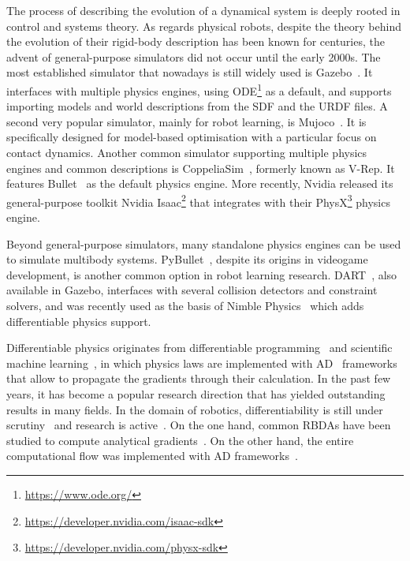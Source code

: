 The process of describing the evolution of a dynamical system is deeply rooted in control and systems theory.
As regards physical robots, despite the theory behind the evolution of their rigid-body description has been known for centuries, the advent of general-purpose simulators did not occur until the early 2000s.
The most established simulator that nowadays is still widely used is Gazebo~\parencite{koenig_design_2004}.
It interfaces with multiple physics engines, using ODE\footnote{\url{https://www.ode.org/}} as a default, and supports importing models and world descriptions from the \ac{SDF} and the \ac{URDF} files.
A second very popular simulator, mainly for robot learning, is Mujoco~\parencite{todorov_mujoco_2012}.
It is specifically designed for model-based optimisation with a particular focus on contact dynamics.
Another common simulator supporting multiple physics engines and common descriptions is CoppeliaSim~\parencite{rohmer_v-rep_2013}, formerly known as V-Rep.
It features Bullet~\parencite{coumans_pybullet_2016} as the default physics engine.
More recently, Nvidia released its general-purpose toolkit Nvidia Isaac\footnote{\url{https://developer.nvidia.com/isaac-sdk}} that integrates with their PhysX\footnote{\url{https://developer.nvidia.com/physx-sdk}} physics engine.

Beyond general-purpose simulators, many standalone physics engines can be used to simulate multibody systems.
PyBullet~\parencite{coumans_pybullet_2016}, despite its origins in videogame development, is another common option in robot learning research.
DART~\parencite{lee_dart_2018}, also available in Gazebo, interfaces with several collision detectors and constraint solvers, and was recently used as the basis of Nimble Physics~\parencite{werling_fast_2021} which adds differentiable physics support.

Differentiable physics originates from differentiable programming~\parencite{innes_differentiable_2019} and scientific machine learning~\parencite{rackauckas_universal_2021}, in which physics laws are implemented with \ac{AD}~\parencite{baydin_automatic_2018} frameworks that allow to propagate the gradients through their calculation.
In the past few years, it has become a popular research direction that has yielded outstanding results in many fields.
In the domain of robotics, differentiability is still under scrutiny~\parencite{suh_differentiable_2022} and research is active~\parencite{gillen_leveraging_2022}.
On the one hand, common \acp{RBDA} have been studied to compute analytical gradients~\parencite{carpentier_analytical_2018, belbute-peres_end--end_2018, singh_efficient_2022}.
On the other hand, the entire computational flow was implemented with \ac{AD} frameworks~\parencite{freeman_brax_2021, howell_dojo_2022}.

